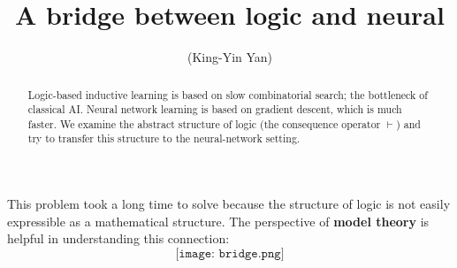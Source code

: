 \documentclass[orivec]{llncs}
\title{A bridge between logic and neural}
\author{\usebox{\MyName} (King-Yin Yan)
}
\institute{General.Intelligence@Gmail.com}
\newcommand{\emp}[1]{\textbf{\textcolor{Cerulean}{#1}}}
\begin{document}
\maketitle
\setlength{\parindent}{0em}
\setlength{\parskip}{2.8ex}


\begin{abstract}
Logic-based inductive learning is based on slow combinatorial search; the bottleneck of classical AI.  Neural network learning is based on gradient descent, which is much faster.  We examine the abstract structure of logic (the consequence operator $\vdash$) and try to transfer this structure to the neural-network setting.


\end{abstract}





This problem took a long time to solve because the structure of logic is not easily expressible as a mathematical structure.  The perspective of \textbf{model theory} is helpful in understanding this connection:
\begin{equation}
\texttt{[image: bridge.png]}
\end{equation}
\end{document}
